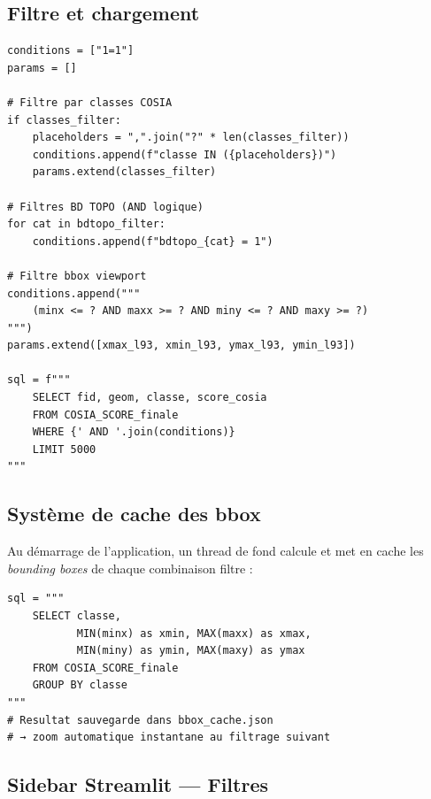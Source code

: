 \documentclass[11pt,a4paper]{report}
\begin{document}
\subsection{Filtre et chargement}

\begin{lstlisting}[language=Python3, caption={Requête SQL avec filtres dynamiques (api\_features)}]
conditions = ["1=1"]
params = []

# Filtre par classes COSIA
if classes_filter:
    placeholders = ",".join("?" * len(classes_filter))
    conditions.append(f"classe IN ({placeholders})")
    params.extend(classes_filter)

# Filtres BD TOPO (AND logique)
for cat in bdtopo_filter:
    conditions.append(f"bdtopo_{cat} = 1")

# Filtre bbox viewport
conditions.append("""
    (minx <= ? AND maxx >= ? AND miny <= ? AND maxy >= ?)
""")
params.extend([xmax_l93, xmin_l93, ymax_l93, ymin_l93])

sql = f"""
    SELECT fid, geom, classe, score_cosia
    FROM COSIA_SCORE_finale
    WHERE {' AND '.join(conditions)}
    LIMIT 5000
"""
\end{lstlisting}

\subsection{Système de cache des bbox}

Au démarrage de l'application, un thread de fond calcule et met en cache les \textit{bounding boxes} de chaque combinaison filtre :

\begin{lstlisting}[language=Python3, caption={Pré-calcul de la bbox par classe (background thread)}]
sql = """
    SELECT classe,
           MIN(minx) as xmin, MAX(maxx) as xmax,
           MIN(miny) as ymin, MAX(maxy) as ymax
    FROM COSIA_SCORE_finale
    GROUP BY classe
"""
# Resultat sauvegarde dans bbox_cache.json
# → zoom automatique instantane au filtrage suivant
\end{lstlisting}

\subsection{Sidebar Streamlit — Filtres}
\end{document}
